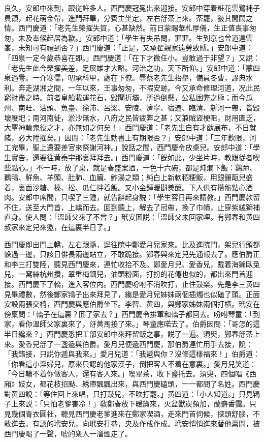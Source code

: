 良久，安郎中來到，跟従許多人。西門慶冠冕出來迎接。安郎中穿着粧花雲鷺補子員領，起花萌金帶，進門拜畢，分賓主坐定，左右㧱茶上來。茶罷，敍其間闊之情。西門慶道：「老先生榮擢失賀，心甚缺然。前日蒙賜華札厚儀，生正值喪事匆匆，未及奉候起居為歉。」安郎中道：「學生有失吊問，罪罪。生到京也曾道達雲峯，未知可有禮到否？」西門慶道：「正是，又承翟親家遠勞致賻。」安郎中道：「四泉一定今歲恭喜在即。」西門慶道：「在下才微任小。豈敢過于非望？」又說：「老先生此今榮擢美差，足展雄才大略。河治之功，天下所仰。」安郎中道：「蒙四泉過譽。一介寒儒，叨承科甲，處在下僚。辱蔡老先生抬擧，備員冬曹，謬典水利。奔走湖湘之間，一年以來，王事匆匆，不暇安跡。今又承命修理河道，况此民窮財盡之時。前者皇船載運花石，毀閘折壩，所過倒懸，公私困弊之極；而今瓜州、南旺、沽頭、魚臺、徐沛、呂梁、安陵、濟寜、宿遷、臨清、新河一帶，皆毀壞廢圯；南河南徙，淤沙無水，八府之民皆疲弊之甚；又兼賊盜梗阻，財用匱乏，大覃神輸鬼役之才，亦無如之何矣！」西門慶道：「老先生自有才猷展布，不日就緒，必大陞擢矣。」因問：「老先生勅書上有期限否？」安郎中道：「三年欽限，河工完畢，聖上還要差官來祭謝河神。」說話之間，西門慶令放桌兒。安郎中道：「學生實告，還要往黄泰宇那裏拜拜去。」西門慶道：「旣如此，少坐片時，教跟従者喫些點心。」不一時，放了桌，就是春盛案酒，一色十六碗，都是炖爛下飯：鷄蹄、鵝鴨、鮮魚、羊頭、肚肺、血臟、鮓湯之類；純白上新軟稻粳飯，用銀鑲甌兒盛着，裏面沙糖、榛、松、瓜仁拌着飯。又小金鍾暖斟羙釀。下人俱有攢盤點心酒肉。安郎中席間，只喫了三鍾，就告辭起身説：「學生容日再來請教。」西門慶款留不住，送至大門首，上轎而去。囬到聽上，解去了冠帶，換了巾幘，止穿紫絨獅補直身。使人問：「溫師父來了不曾？」玳安囬説：「溫師父未回家哩。有鄭春和黄四叔家來定兒來邀，在這裏半日了。」

西門慶即出門上轎，左右跟隨，逕往院中鄭愛月兒家來。比及進院門，架兒行頭都躲過一邊，只該日俳長兩邊站立，不敢跪接。鄭春與來定兒先通報去了。應伯爵正和李三打雙陸，聽見西門慶來，連忙收拾不及。鄭愛月兒、愛香兒，戴着海獺臥兔兒，一窝絲杭州攢，翠重梅鈿兒，油頭粉面，打扮的花僊也似的，都出來門首迎接。西門慶下了轎，進入客位内。西門慶吩咐不消吹打，止住鼓楽。先是李三黄四見畢禮數，然後鄭家鴇子出來拜見了，纔是愛月兒姊妹兩個插燭也似磕了頭。正面安設兩張交椅，西門慶與應伯爵坐下。李智、黄四，與鄭家姊妹兩個打横。玳安在傍稟問：「轎子在這裏？囬了家去？」西門慶令排軍和轎子都回去。吩咐琴童：「到家，看你溫師父家裏來了，㧱黄馬接了來。」琴童應喏去了。伯爵因問：「哥怎的這半日纔來？」西門慶悉把工部安郎中來拜留飯之事，説了一遍。須臾，鄭春㧱茶上來。愛香兒㧱了一盞遞與伯爵。愛月兒便遞西門慶，那伯爵連忙用手去接，說：「我錯接，只説你遞與我來。」愛月兒道：「我遞與你？沒修這樣福來！」伯爵道：「你看這小淫婦兒，原來只認的他家漢子，倒把客人不着在意裏。」愛月兒笑道：「今日輪不着你做客人，還有客人來。」喫畢茶，收下盞托去。須臾，四個唱《西廂》妓女，都花枝招颭、綉帶飄飄出來，與西門慶磕頭，一一都問了名姓。西門慶對黄四說：「等住回上來唱，只打鼓兒，不吹打罷。」黄四道：「小人知道。」只見鴇子上來説：「只怕老爹害冷！」敎鄭春放下暖簾來，火盆獸炭頻加，蘭麝香靄。只見幾個青衣圓社，聽見西門慶老爹進來在鄭家喫酒，走來門首伺候，探頭舒腦，不敢進去。有認的玳安兒，向玳安打恭，央及作成作成。玳安悄悄進來替他禀問，被西門慶喝了一聲，唬的衆人一溜煙走了。

